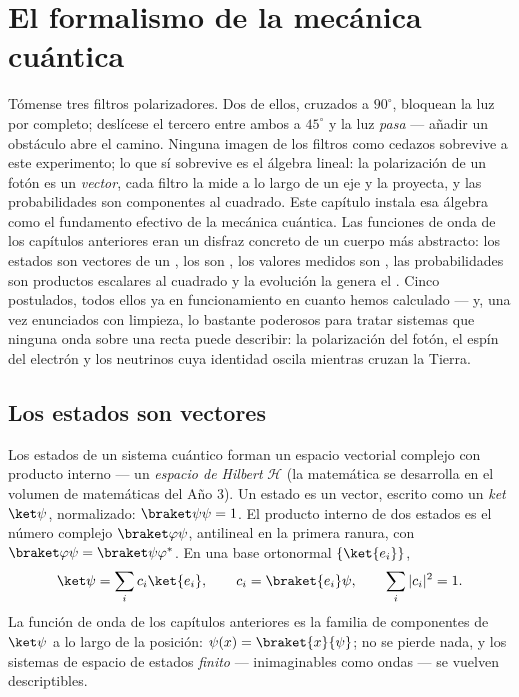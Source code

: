 \chapter{El formalismo de la mecánica cuántica}\label{ch:b3:quantum-formalism}

Tómense tres filtros polarizadores. Dos de ellos, cruzados a $90^\circ$,
bloquean la luz por completo; deslícese el tercero entre ambos a $45^\circ$ y
la luz \emph{pasa} --- añadir un obstáculo abre el camino. Ninguna imagen de
los filtros como cedazos sobrevive a este experimento; lo que sí sobrevive
es el álgebra lineal: la polarización de un fotón es un \emph{vector}, cada
filtro la mide a lo largo de un eje y la proyecta, y las probabilidades son
componentes al cuadrado. Este capítulo instala esa álgebra como el
fundamento efectivo de la mecánica cuántica. Las funciones de onda de los
capítulos anteriores eran un disfraz concreto de un cuerpo más abstracto:
los estados son vectores de un , los  son
, los valores medidos son , las
probabilidades son productos escalares al cuadrado y la evolución la genera
el . Cinco postulados, todos ellos ya en funcionamiento en cuanto
hemos calculado --- y, una vez enunciados con limpieza, lo bastante
poderosos para tratar sistemas que ninguna onda sobre una recta puede
describir: la polarización del fotón, el espín del electrón y los neutrinos
cuya identidad oscila mientras cruzan la Tierra.

\section{Los estados son vectores}

\begin{definition}\label{def:b3:quantum-formalism:state}
Los estados de un sistema cuántico forman un espacio vectorial complejo con
producto interno --- un \emph{espacio de Hilbert} $\mathcal H$ (la
matemática se desarrolla en el volumen de matemáticas del Año 3). Un estado
es un vector, escrito como un \emph{ket} $\ket\psi$, normalizado:
$\braket\psi\psi = 1$. El producto interno de dos estados es el número
complejo $\braket\varphi\psi$, antilineal en la primera ranura,
con $\braket\varphi\psi = \braket\psi\varphi^*$. En una base ortonormal
$\{\ket{e_i}\}$,
\[
\ket\psi = \sum_i c_i\ket{e_i} , \qquad
c_i = \braket{e_i}\psi , \qquad
\sum_i|c_i|^2 = 1 .
\]
La función de onda de los capítulos anteriores es la familia de componentes
de $\ket\psi$ a lo largo de la posición: $\psi(x) =
\braket{x}{\psi}$; no se pierde nada, y los sistemas de espacio de estados
\emph{finito} --- inimaginables como ondas --- se vuelven descriptibles.
\end{definition}

